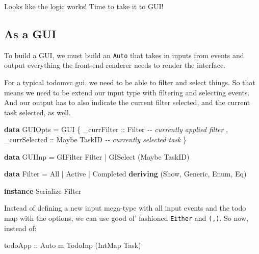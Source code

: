\documentclass[]{article}
\newenvironment{Shaded}{}{}
\newcommand{\CommentTok}[1]{\textcolor[rgb]{0.38,0.63,0.69}{\textit{#1}}}
\newcommand{\DataTypeTok}[1]{\textcolor[rgb]{0.56,0.13,0.00}{#1}}
\newcommand{\KeywordTok}[1]{\textcolor[rgb]{0.00,0.44,0.13}{\textbf{#1}}}
\newcommand{\NormalTok}[1]{#1}
\newcommand{\OperatorTok}[1]{\textcolor[rgb]{0.40,0.40,0.40}{#1}}
\newcommand{\OtherTok}[1]{\textcolor[rgb]{0.00,0.44,0.13}{#1}}
\begin{document}
Looks like the logic works! Time to take it to GUI!

\subsection{As a GUI}\label{as-a-gui}

To build a GUI, we must build an \texttt{Auto} that takes in inputs from events
and output everything the front-end renderer needs to render the interface.

For a typical todomvc gui, we need to be able to filter and select things. So
that means we need to be extend our input type with filtering and selecting
events. And our output has to also indicate the current filter selected, and the
current task selected, as well.

\begin{Shaded}
\begin{Highlighting}[]
\KeywordTok{data} \DataTypeTok{GUIOpts} \OtherTok{=} \DataTypeTok{GUI}\NormalTok{ \{}\OtherTok{ \_currFilter   ::} \DataTypeTok{Filter}        \CommentTok{{-}{-} currently applied filter}
\NormalTok{                   ,}\OtherTok{ \_currSelected ::} \DataTypeTok{Maybe} \DataTypeTok{TaskID}  \CommentTok{{-}{-} currently selected task}
\NormalTok{                   \}}

\KeywordTok{data} \DataTypeTok{GUIInp} \OtherTok{=} \DataTypeTok{GIFilter} \DataTypeTok{Filter}
            \OperatorTok{|} \DataTypeTok{GISelect}\NormalTok{ (}\DataTypeTok{Maybe} \DataTypeTok{TaskID}\NormalTok{)}

\KeywordTok{data} \DataTypeTok{Filter} \OtherTok{=} \DataTypeTok{All} \OperatorTok{|} \DataTypeTok{Active} \OperatorTok{|} \DataTypeTok{Completed}
            \KeywordTok{deriving}\NormalTok{ (}\DataTypeTok{Show}\NormalTok{, }\DataTypeTok{Generic}\NormalTok{, }\DataTypeTok{Enum}\NormalTok{, }\DataTypeTok{Eq}\NormalTok{)}

\KeywordTok{instance} \DataTypeTok{Serialize} \DataTypeTok{Filter}
\end{Highlighting}
\end{Shaded}

Instead of defining a new input mega-type with all input events and the todo map
with the options, we can use good ol' fashioned \texttt{Either} and
\texttt{(,)}. So now, instead of:

\begin{Shaded}
\begin{Highlighting}[]
\OtherTok{todoApp ::} \DataTypeTok{Auto}\NormalTok{ m }\DataTypeTok{TodoInp}\NormalTok{ (}\DataTypeTok{IntMap} \DataTypeTok{Task}\NormalTok{)}
\end{Highlighting}
\end{Shaded}
\end{document}

